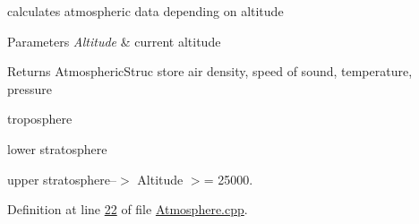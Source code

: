 calculates atmospheric data depending on altitude 


\begin{DoxyParams}{Parameters}
{\em Altitude} & current altitude \\
\hline
\end{DoxyParams}
\begin{DoxyReturn}{Returns}
Atmospheric\+Struc store air density, speed of sound, temperature, pressure 
\end{DoxyReturn}
troposphere

lower stratosphere

upper stratosphere--$>$ Altitude $>$= 25000. 

Definition at line \hyperlink{_atmosphere_8cpp_source_l00022}{22} of file \hyperlink{_atmosphere_8cpp_source}{Atmosphere.\+cpp}.

